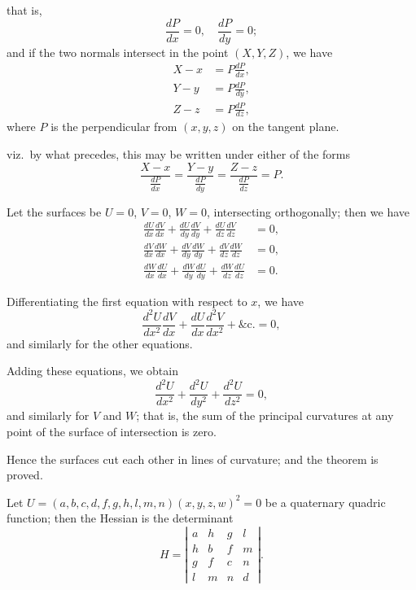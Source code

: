 \documentclass[11pt,a4paper]{book}
\begin{document}
\newpage

that is,
\[
\frac{dP}{dx} = 0, \quad \frac{dP}{dy} = 0;
\]
and if the two normals intersect in the point $(X, Y, Z)$, we have
\begin{align*}
X - x &= P\frac{dP}{dx}, \\
Y - y &= P\frac{dP}{dy}, \\
Z - z &= P\frac{dP}{dz},
\end{align*}
where $P$ is the perpendicular from $(x, y, z)$ on the tangent plane.

viz.\ by what precedes, this may be written under either of the forms
\[
\frac{X - x}{\frac{dP}{dx}} = \frac{Y - y}{\frac{dP}{dy}} = \frac{Z - z}{\frac{dP}{dz}} = P.
\]

\newpage

Let the surfaces be $U = 0$, $V = 0$, $W = 0$, intersecting orthogonally; then we have
\begin{align*}
\frac{dU}{dx}\frac{dV}{dx} + \frac{dU}{dy}\frac{dV}{dy} + \frac{dU}{dz}\frac{dV}{dz} &= 0, \\
\frac{dV}{dx}\frac{dW}{dx} + \frac{dV}{dy}\frac{dW}{dy} + \frac{dV}{dz}\frac{dW}{dz} &= 0, \\
\frac{dW}{dx}\frac{dU}{dx} + \frac{dW}{dy}\frac{dU}{dy} + \frac{dW}{dz}\frac{dU}{dz} &= 0.
\end{align*}

Differentiating the first equation with respect to $x$, we have
\[
\frac{d^2U}{dx^2}\frac{dV}{dx} + \frac{dU}{dx}\frac{d^2V}{dx^2} + \&\text{c.} = 0,
\]
and similarly for the other equations.

\newpage

Adding these equations, we obtain
\[
\frac{d^2U}{dx^2} + \frac{d^2U}{dy^2} + \frac{d^2U}{dz^2} = 0,
\]
and similarly for $V$ and $W$; that is, the sum of the principal curvatures at any point of the surface of intersection is zero.

Hence the surfaces cut each other in lines of curvature; and the theorem is proved.

\newpage


Let $U = (a, b, c, d, f, g, h, l, m, n)(x, y, z, w)^2 = 0$ be a quaternary quadric function; then the Hessian is the determinant
\[
H = \left| \begin{array}{cccc}
a & h & g & l \\
h & b & f & m \\
g & f & c & n \\
l & m & n & d
\end{array} \right|.
\]
\end{document}
